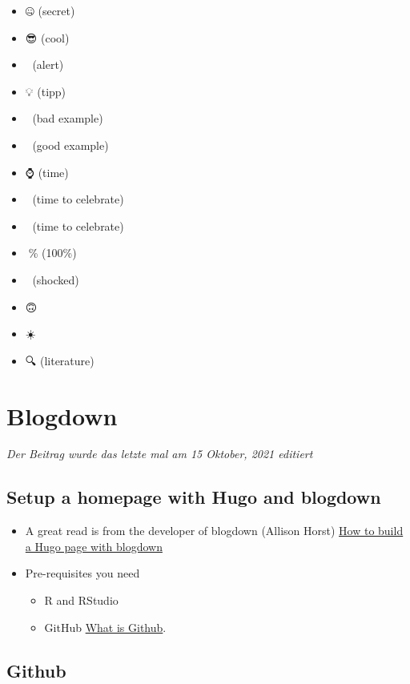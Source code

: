 \documentclass[
]{article}
\providecommand{\tightlist}{%
  \setlength{\itemsep}{0pt}\setlength{\parskip}{0pt}}
\begin{document}
\begin{itemize}
\tightlist
\item
  🤐 (secret)
\item
  😎 (cool)
\item
  🚨 (alert)
\item
  💡 (tipp)
\item
  💩 (bad example)
\item
  💪 (good example)
\item
  ⌚️ (time)
\item
  🍻 (time to celebrate)
\item
  🎉 (time to celebrate)
\item
  💯\% (100\%)
\item
  🤯 (shocked)
\item
  🙃
\item
  ☀️
\item
  🔍 (literature)
\end{itemize}

\hypertarget{blogdown}{%
\section{Blogdown}\label{blogdown}}

\emph{Der Beitrag wurde das letzte mal am 15 Oktober, 2021 editiert}

\hypertarget{setup-a-homepage-with-hugo-and-blogdown}{%
\subsection{Setup a homepage with Hugo and blogdown}\label{setup-a-homepage-with-hugo-and-blogdown}}

\begin{itemize}
\tightlist
\item
  A great read is from the developer of blogdown (Allison Horst) \href{https://alison.rbind.io/post/new-year-new-blogdown/}{How
  to build a Hugo page with
  blogdown}
\item
  Pre-requisites you need

  \begin{itemize}
  \tightlist
  \item
    R and RStudio
  \item
    GitHub \href{https://happygitwithr.com/}{What is Github}.
  \end{itemize}
\end{itemize}

\hypertarget{github-1}{%
\subsection{Github}\label{github-1}}
\end{document}
